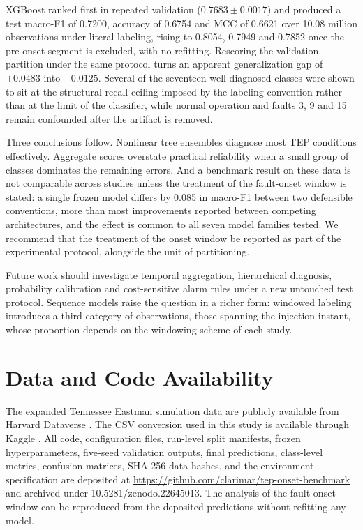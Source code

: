 \documentclass[10pt,twocolumn,a4paper]{article}
\begin{document}
XGBoost ranked first in repeated validation ($0.7683\pm0.0017$) and produced a
test macro-F1 of 0.7200, accuracy of 0.6754 and MCC of 0.6621 over 10.08
million observations under literal labeling, rising to 0.8054, 0.7949 and
0.7852 once the pre-onset segment is excluded, with no refitting. Rescoring the
validation partition under the same protocol turns an apparent generalization
gap of $+0.0483$ into $-0.0125$. Several of the seventeen well-diagnosed
classes were shown to sit at the structural recall ceiling imposed by the
labeling convention rather than at the limit of the classifier, while normal
operation and faults 3, 9 and 15 remain confounded after the artifact is
removed.

Three conclusions follow. Nonlinear tree ensembles diagnose most TEP conditions
effectively. Aggregate scores overstate practical reliability when a small group
of classes dominates the remaining errors. And a benchmark result on these data
is not comparable across studies unless the treatment of the fault-onset window
is stated: a single frozen model differs by 0.085 in macro-F1 between two
defensible conventions, more than most improvements reported between competing
architectures, and the effect is common to all seven model families tested. We
recommend that the treatment of the onset window be reported as part of the
experimental protocol, alongside the unit of partitioning.

Future work should investigate temporal aggregation, hierarchical diagnosis,
probability calibration and cost-sensitive alarm rules under a new untouched
test protocol. Sequence models raise the question in a richer form: windowed
labeling introduces a third category of observations, those spanning the
injection instant, whose proportion depends on the windowing scheme of each
study.

\section*{Data and Code Availability}

The expanded Tennessee Eastman simulation data are publicly available from
Harvard Dataverse \cite{rieth2017data}. The CSV conversion used in this study is
available through Kaggle \cite{kaggleTEP}. All code, configuration files,
run-level split manifests, frozen hyperparameters, five-seed validation
outputs, final predictions, class-level metrics, confusion matrices, SHA-256
data hashes, and the environment specification are deposited at
\url{https://github.com/clarimar/tep-onset-benchmark} and archived under
10.5281/zenodo.22645013. The analysis of the fault-onset window can be
reproduced from the deposited predictions without refitting any model.
\end{document}
